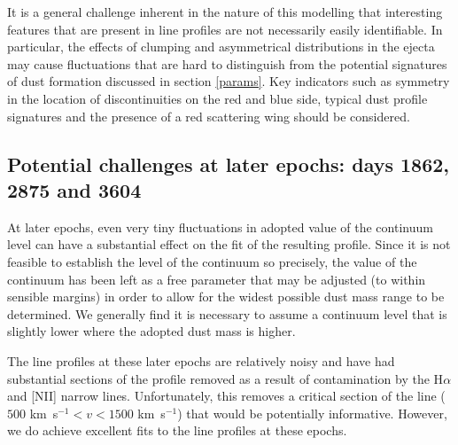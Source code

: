 \documentclass[useAMS,usenatbib,usegraphicx]{mnras}
\begin{document}
It is a general challenge inherent in the nature of this modelling that 
interesting features that are present in line profiles are not necessarily 
easily identifiable.  In particular, the effects of clumping and 
asymmetrical distributions in the ejecta may cause fluctuations that are 
hard to distinguish from the potential signatures of dust formation 
discussed in section \ref{params}.  Key indicators such as symmetry in the 
location of discontinuities on the red and blue side, typical dust profile 
signatures and the presence of a red scattering wing should be considered.


\subsection{Potential challenges at later epochs: days 1862, 2875 and 3604}

At later epochs, even very tiny fluctuations in adopted value of the 
continuum level can have a substantial effect on the fit of the resulting 
profile.  Since it is not feasible to establish the level of the continuum 
so precisely, the value of the continuum has been left as a free parameter 
that may be adjusted (to within sensible margins) in order to allow for 
the widest possible dust mass range to be determined.  We generally find 
it is necessary to assume a continuum level that is slightly lower where 
the adopted dust mass is higher.

The line profiles at these later epochs are relatively noisy and have had 
substantial sections of the profile removed as a result of contamination 
by the H$\alpha$ and [NII] narrow lines.  Unfortunately, this removes a 
critical section of the line ($500$ km~s$^{-1}<v<1500$ km~s$^{-1}$) that 
would be potentially informative.  However, we do achieve excellent fits 
to the line profiles at these epochs.
\end{document}
